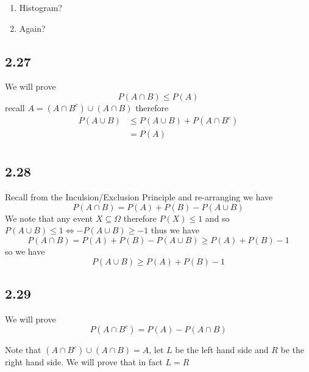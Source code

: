 \documentclass[11pt]{book}
\begin{document}
\begin{enumerate}[label=\alph*)]
    \item Histogram?
    \item Again?
\end{enumerate}


\subsection{2.27}%
\label{sub:2_27}

We will prove 
\[
P\left(A\cap B\right) \le P\left(A\right) 
\]
recall $A= \left( A\cap B^{c}  \right) \cup \left( A\cap B \right)  $ therefore 
\begin{align*}
    P\left(A \cup B\right) &\le P\left(A\cup B\right)  + P\left(A\cap B^{c} \right) \tag{Axiom 1}   \\ 
    &= P\left(A\right) \tag{Axiom 3} \\ 
\end{align*}


\subsection{2.28}%
\label{sub:2_28}

Recall from the Inculsion/Exclusion Principle  and re-arranging we have 
\[
P\left(A\cap B\right) = P\left(A\right)  + P\left(B\right)  - P\left(A\cup B\right) 
\]
We note that any event $X \subseteq \Omega $ therefore $P\left(X\right) \le 1$ and so $P\left(A\cup B\right) \le 1 \Leftrightarrow -P\left(A\cup B\right) \ge -1$ thus we have 
\[
P\left(A\cap B\right) = P\left(A\right)  + P\left(B\right)  - P\left(A\cup B\right) \ge P\left(A\right)  + P\left(B\right)  - 1
\]
so we have
\[
P\left(A\cup B\right) \ge P\left(A\right)  + P\left(B\right)  - 1
\]


\subsection{2.29}%
\label{sub:2_29}

We will prove 
\[
P\left(A\cap B^{c} \right) = P\left(A\right)  - P\left(A\cap B\right) 
\]

Note that $\left( A\cap B^{c}  \right) \cup \left( A\cap B  \right) = A$, let $L$ be the left hand side and $R$ be the right hand side. We will prove that in fact $L = R$ 
\end{document}
